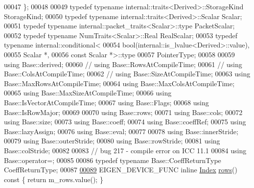 \begin{DoxyCode}
00047     \};
00048 
00049     \textcolor{keyword}{typedef} \textcolor{keyword}{typename} internal::traits<Derived>::StorageKind StorageKind;
00050     \textcolor{keyword}{typedef} \textcolor{keyword}{typename} internal::traits<Derived>::Scalar Scalar;
00051     \textcolor{keyword}{typedef} \textcolor{keyword}{typename} internal::packet\_traits<Scalar>::type PacketScalar;
00052     \textcolor{keyword}{typedef} \textcolor{keyword}{typename} NumTraits<Scalar>::Real RealScalar;
00053     \textcolor{keyword}{typedef} \textcolor{keyword}{typename} internal::conditional<
00054                          bool(internal::is\_lvalue<Derived>::value),
00055                          Scalar *,
00056                          \textcolor{keyword}{const} Scalar *>::type
00057                      PointerType;
00058 
00059     \textcolor{keyword}{using} Base::derived;
00060 \textcolor{comment}{//    using Base::RowsAtCompileTime;}
00061 \textcolor{comment}{//    using Base::ColsAtCompileTime;}
00062 \textcolor{comment}{//    using Base::SizeAtCompileTime;}
00063     \textcolor{keyword}{using} Base::MaxRowsAtCompileTime;
00064     \textcolor{keyword}{using} Base::MaxColsAtCompileTime;
00065     \textcolor{keyword}{using} Base::MaxSizeAtCompileTime;
00066     \textcolor{keyword}{using} Base::IsVectorAtCompileTime;
00067     \textcolor{keyword}{using} Base::Flags;
00068     \textcolor{keyword}{using} Base::IsRowMajor;
00069 
00070     \textcolor{keyword}{using} Base::rows;
00071     \textcolor{keyword}{using} Base::cols;
00072     \textcolor{keyword}{using} Base::size;
00073     \textcolor{keyword}{using} Base::coeff;
00074     \textcolor{keyword}{using} Base::coeffRef;
00075     \textcolor{keyword}{using} Base::lazyAssign;
00076     \textcolor{keyword}{using} Base::eval;
00077 
00078     \textcolor{keyword}{using} Base::innerStride;
00079     \textcolor{keyword}{using} Base::outerStride;
00080     \textcolor{keyword}{using} Base::rowStride;
00081     \textcolor{keyword}{using} Base::colStride;
00082 
00083     \textcolor{comment}{// bug 217 - compile error on ICC 11.1}
00084     \textcolor{keyword}{using} Base::operator=;
00085 
00086     \textcolor{keyword}{typedef} \textcolor{keyword}{typename} Base::CoeffReturnType CoeffReturnType;
00087 
\hyperlink{group___core___module_a78b3ab4983de51f112e6a062ac8f6ffd}{00089}     EIGEN\_DEVICE\_FUNC \textcolor{keyword}{inline} \hyperlink{namespace_eigen_a62e77e0933482dafde8fe197d9a2cfde}{Index} \hyperlink{group___core___module_a78b3ab4983de51f112e6a062ac8f6ffd}{rows}()\textcolor{keyword}{ const }\{ \textcolor{keywordflow}{return} m\_rows.value(); \}

\end{DoxyCode}
